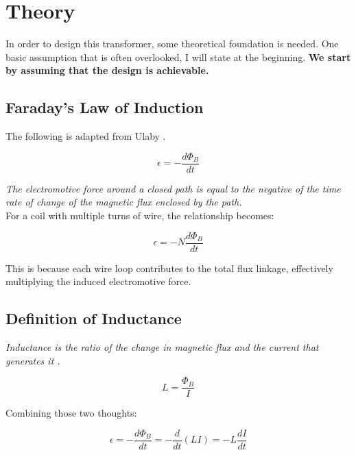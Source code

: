 \documentclass{article}
\begin{document}
\section{Theory}
In order to design this transformer, some theoretical foundation is needed.
One basic assumption that is often overlooked, I will state at the beginning.
\textbf{We start by assuming that the design is achievable.}

\subsection{Faraday's Law of Induction}

The following is adapted from Ulaby \cite[pp. 256--257]{ulaby2007fae}.

\begin{equation}
    \epsilon = - \frac{d \Phi_B}{dt}
    \label{eq:faraday1}
\end{equation}

\emph{The electromotive force around a closed path is equal to the negative of the time rate of change of the magnetic flux enclosed by the path.} \\

For a coil with multiple turns of wire, the relationship becomes:

\begin{equation}
    \epsilon = - N \frac{d \Phi_B}{dt}
    \label{eq:faraday2}
\end{equation}

This is because each wire loop contributes to the total flux linkage, effectively multiplying the induced electromotive force.

\subsection{Definition of Inductance}

\emph{Inductance is the ratio of the change in magnetic flux and the current that generates it \cite[p. 239]{ulaby2007fae}.}

\begin{equation}
    L = \frac{\Phi_B}{I}
    \label{eq:inductance1}
\end{equation}

Combining those two thoughts:

\begin{equation}
    \epsilon = - \frac{d \Phi_B}{dt} = - \frac{d}{dt} (LI) = -L \frac{dI}{dt}
    \label{eq:inductance2}
\end{equation}
\end{document}
